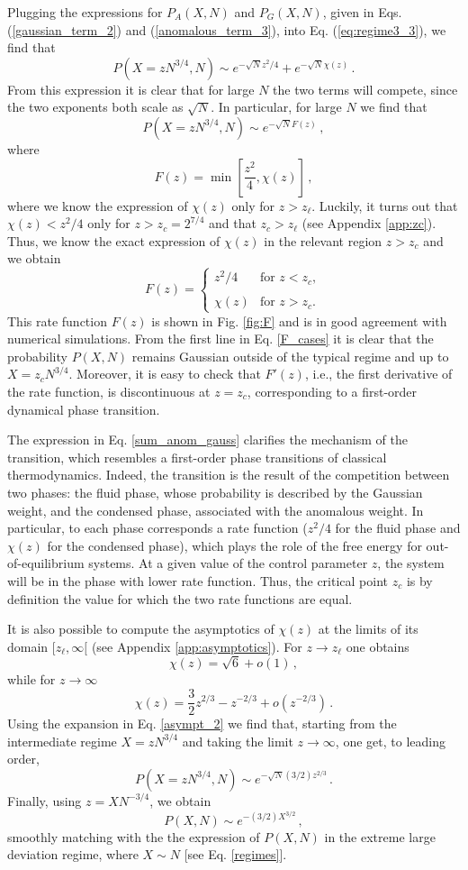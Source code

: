 \documentclass[aps,pre,twocolumn,superscriptaddress,showpacs]{revtex4-1}
\newcommand{\be}{\begin{equation}}
\newcommand{\ee}{\end{equation}}
\begin{document}
Plugging the expressions for $P_A(X,N)$ and $P_G(X,N)$, given in Eqs. (\ref{gaussian_term_2}) and (\ref{anomalous_term_3}), into Eq. (\ref{eq:regime3_3}), we find that
\be
P(X= z N^{3/4},N)\sim e^{-\sqrt{N} z^2/4}+ e^{-\sqrt{N}\chi(z)}\,.
\label{sum_anom_gauss}
\ee
From this expression it is clear that for large $N$ the two terms will compete, since the two exponents both scale as $\sqrt{N}$. In particular, for large $N$ we find that
\be
P(X= z N^{3/4},N)\sim e^{-\sqrt{N} F(z)}\,,
\ee
where 
\be 
F(z)=\min\left[\frac{z^2}{4},\chi(z)\right]\,,
\label{F}
\ee
where we know the expression of $\chi(z)$ only for $z>z_{\ell}$.  Luckily, it turns out that $\chi(z)<z^2/4$ only for $z>z_c=2^{7/4}$ and that $z_c>z_{\ell}$ (see Appendix \ref{app:zc}). Thus, we know the exact expression of $\chi(z)$ in the relevant region $z>z_{c}$ and we obtain
\be
F(z)=
\begin{cases}
z^2/4 & \text{for } z<z_c,\\
\\
\chi(z) & \text{for } z>z_c.
\end{cases}
\label{F_cases}
\ee
This rate function $F(z)$ is shown in Fig. \ref{fig:F} and is in good agreement with numerical simulations. From the first line in Eq. \eqref{F_cases} it is clear that the probability $P(X,N)$ remains Gaussian outside of the typical regime and up to $X= z_c N^{3/4}$. Moreover, it is easy to check that $F'(z)$, i.e., the first derivative of the rate function, is discontinuous at $z=z_c$, corresponding to a first-order dynamical phase transition.


The expression in Eq. \eqref{sum_anom_gauss} clarifies the mechanism of the transition, which resembles a first-order phase transitions of classical thermodynamics. Indeed, the transition is the result of the competition between two phases: the fluid phase, whose probability is described by the Gaussian weight, and the condensed phase, associated with the anomalous weight. In particular, to each phase corresponds a rate function ($z^2/4$ for the fluid phase and $\chi(z)$ for the condensed phase), which plays the role of the free energy for out-of-equilibrium systems. At a given value of the control parameter $z$, the system will be in the phase with lower rate function. Thus, the critical point $z_c$ is by definition the value for which the two rate functions are equal.




It is also possible to compute the asymptotics of $\chi(z)$ at the limits of its domain $[z_{\ell},\infty[$ (see Appendix \ref{app:asymptotics}). For $z\to z_{\ell}$ one obtains
\be
\chi(z)=\sqrt{6} +o(1)\,,
\ee
while for $z\to \infty$ 
\be
\chi(z)=\frac{3}{2}z^{2/3}- z^{-2/3}+o(z^{-2/3})\,.
\label{asympt_2}
\ee
Using the expansion in Eq. \eqref{asympt_2} we find that, starting from the intermediate regime $X=z N^{3/4} $ and taking the limit $z\to \infty$, one get, to leading order, 
\be
P(X= z N^{3/4},N)\sim e^{-\sqrt{N}(3/2)z^{2/3}}\,.
\ee
Finally, using $z=X N^{-3/4}$, we obtain
\be
P(X,N)\sim e^{-(3/2) X^{3/2}}\,,
\ee
smoothly matching with the the expression of $P(X,N)$ in the extreme large deviation regime, where $X\sim N$ [see Eq. \eqref{regimes}].
\end{document}
